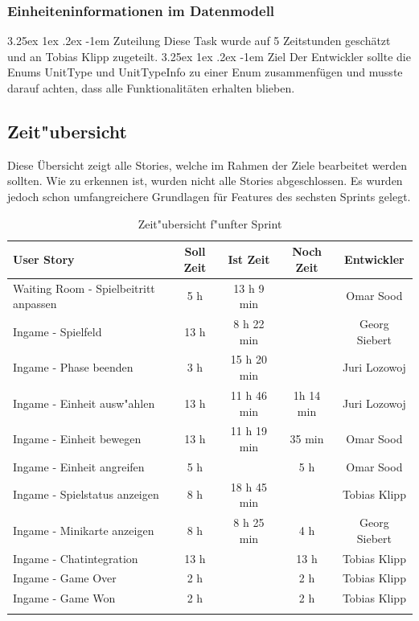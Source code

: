 \documentclass[12pt, titlepage]{scrartcl}
\makeatletter
\renewcommand\paragraph{\@startsection{paragraph}{5}{\z@}%
  {3.25ex \@plus1ex \@minus.2ex}%
  {-1em}%
  {\normalfont\normalsize\bfseries}}
\makeatother
\begin{document}
            \subsubsection{Einheiteninformationen im Datenmodell} \label{task_unit_properties}
            	\paragraph{Zuteilung}
            		Diese Task wurde auf 5 Zeitstunden gesch\"atzt und an Tobias Klipp zugeteilt.
            	\paragraph{Ziel}
            		Der Entwickler sollte die Enums UnitType und UnitTypeInfo zu einer Enum zusammenf\"ugen und musste darauf achten, dass alle Funktionalit\"aten erhalten blieben.
    \newpage
        \subsection{Zeit"ubersicht}
        	Diese \"Ubersicht zeigt alle Stories, welche im Rahmen der Ziele bearbeitet werden sollten. Wie zu erkennen ist, wurden nicht alle Stories abgeschlossen. Es wurden jedoch schon umfangreichere Grundlagen f\"ur Features des sechsten Sprints gelegt.
        	\begin{longtable}[H]{p{6cm} c c c c }
        			\label{Time_1}
       				\textbf{User Story} & \textbf{Soll Zeit} & \textbf{Ist Zeit} & \textbf{Noch Zeit} & \textbf{Entwickler} \\
       				\toprule
       				\endhead
       				Waiting Room - Spielbeitritt anpassen & 5 h & 13 h 9 min &  & Omar Sood\\
       				Ingame - Spielfeld & 13 h & 8 h 22 min &  & Georg Siebert\\
       				Ingame - Phase beenden & 3 h & 15 h 20 min &  & Juri Lozowoj \\
       				Ingame - Einheit ausw"ahlen & 13 h & 11 h 46 min & 1h 14 min & Juri Lozowoj \\
       				Ingame - Einheit bewegen & 13 h & 11 h 19 min & 35 min & Omar Sood \\
       				Ingame - Einheit angreifen & 5 h &  & 5 h & Omar Sood \\
       				Ingame - Spielstatus anzeigen & 8 h & 18 h 45 min &  & Tobias Klipp \\
       				Ingame - Minikarte anzeigen & 8 h & 8 h 25 min & 4 h & Georg Siebert \\
       				Ingame - Chatintegration & 13 h &  & 13 h & Tobias Klipp \\
       				Ingame - Game Over & 2 h &  & 2 h & Tobias Klipp \\
       				Ingame - Game Won & 2 h &  & 2 h & Tobias Klipp \\
        			\caption{Zeit"ubersicht f"unfter Sprint}
        	\end{longtable}
\end{document}
